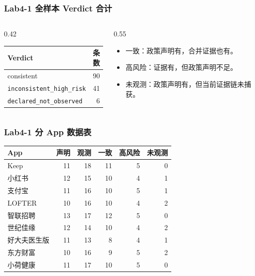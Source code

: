 \documentclass[AutoFakeBold,AutoFakeSlant]{beamer}
\newcommand{\code}[1]{\texttt{#1}}
\begin{document}
\begin{frame}
    \frametitle{Lab4-1 全样本 Verdict 合计}
    \small
    \begin{columns}[T]
        \begin{column}{0.42\textwidth}
            \begin{tabular}{|l|r|}
                \hline
                \textbf{Verdict} & \textbf{条数} \\
                \hline
                consistent & 90 \\
                \hline
                \code{inconsistent\_high\_risk} & 41 \\
                \hline
                \code{declared\_not\_observed} & 6 \\
                \hline
            \end{tabular}
        \end{column}
        \begin{column}{0.55\textwidth}
            \begin{itemize}
                \item 一致：政策声明有，合并证据也有。
                \item 高风险：证据有，但政策声明不足。
                \item 未观测：政策声明有，但当前证据链未捕获。
            \end{itemize}
        \end{column}
    \end{columns}
\end{frame}

\begin{frame}
    \frametitle{Lab4-1 分 App 数据表}
    \tiny
    \begin{tabularx}{\textwidth}{|l|r|r|r|r|r|}
        \hline
        \textbf{App} & \textbf{声明} & \textbf{观测} & \textbf{一致} & \textbf{高风险} & \textbf{未观测} \\
        \hline
        Keep & 11 & 18 & 11 & 5 & 0 \\
        \hline
        小红书 & 12 & 15 & 10 & 4 & 1 \\
        \hline
        支付宝 & 11 & 16 & 10 & 5 & 1 \\
        \hline
        LOFTER & 10 & 16 & 10 & 4 & 2 \\
        \hline
        智联招聘 & 13 & 17 & 12 & 5 & 0 \\
        \hline
        世纪佳缘 & 12 & 14 & 10 & 4 & 2 \\
        \hline
        好大夫医生版 & 11 & 13 & 8 & 4 & 1 \\
        \hline
        东方财富 & 10 & 16 & 9 & 5 & 2 \\
        \hline
        小荷健康 & 11 & 17 & 10 & 5 & 0 \\
        \hline
    \end{tabularx}
\end{frame}
\end{document}
